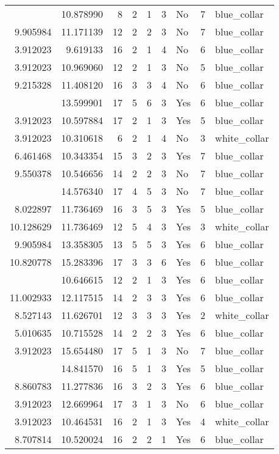 \documentclass[
]{article}
\begin{document}
\begin{longtable}[t]{rrrrrllrl}
\addlinespace
3.912023 & 10.878990 & 8 & 2 & 1 & 3 & No & 7 & blue\_collar\\
9.905984 & 11.171139 & 12 & 2 & 2 & 3 & No & 7 & blue\_collar\\
3.912023 & 9.619133 & 16 & 2 & 1 & 4 & No & 6 & blue\_collar\\
3.912023 & 10.969060 & 12 & 2 & 1 & 3 & No & 5 & blue\_collar\\
9.215328 & 11.408120 & 16 & 3 & 3 & 4 & No & 6 & blue\_collar\\
\addlinespace
11.082911 & 13.599901 & 17 & 5 & 6 & 3 & Yes & 6 & blue\_collar\\
3.912023 & 10.597884 & 17 & 2 & 1 & 3 & Yes & 5 & blue\_collar\\
3.912023 & 10.310618 & 6 & 2 & 1 & 4 & No & 3 & white\_collar\\
6.461468 & 10.343354 & 15 & 3 & 2 & 3 & Yes & 7 & blue\_collar\\
9.550378 & 10.546656 & 14 & 2 & 2 & 3 & No & 7 & blue\_collar\\
\addlinespace
11.828101 & 14.576340 & 17 & 4 & 5 & 3 & No & 7 & blue\_collar\\
8.022897 & 11.736469 & 16 & 3 & 5 & 3 & Yes & 5 & blue\_collar\\
10.128629 & 11.736469 & 12 & 5 & 4 & 3 & Yes & 3 & white\_collar\\
9.905984 & 13.358305 & 13 & 5 & 5 & 3 & Yes & 6 & blue\_collar\\
10.820778 & 15.283396 & 17 & 3 & 3 & 6 & Yes & 6 & blue\_collar\\
\addlinespace
3.912023 & 10.646615 & 12 & 2 & 1 & 3 & Yes & 6 & blue\_collar\\
11.002933 & 12.117515 & 14 & 2 & 3 & 3 & Yes & 6 & blue\_collar\\
8.527143 & 11.626701 & 12 & 3 & 3 & 3 & Yes & 2 & white\_collar\\
5.010635 & 10.715528 & 14 & 2 & 2 & 3 & Yes & 6 & blue\_collar\\
3.912023 & 15.654480 & 17 & 5 & 1 & 3 & No & 7 & blue\_collar\\
\addlinespace
3.912023 & 14.841570 & 16 & 5 & 1 & 3 & Yes & 5 & blue\_collar\\
8.860783 & 11.277836 & 16 & 3 & 2 & 3 & Yes & 6 & blue\_collar\\
3.912023 & 12.669964 & 17 & 3 & 1 & 3 & No & 6 & blue\_collar\\
3.912023 & 10.464531 & 16 & 2 & 1 & 3 & Yes & 4 & white\_collar\\
8.707814 & 10.520024 & 16 & 2 & 2 & 1 & Yes & 6 & blue\_collar\\

\end{longtable}
\end{document}
